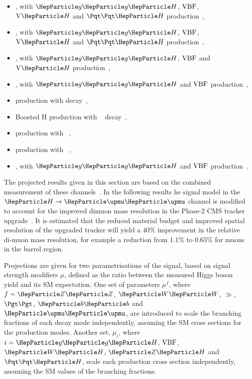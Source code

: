 \begin{itemize}
	\item \hgg, with $\ggh$, $\mathrm{VBF}$, $\vh$ and $\tth$ production~\cite{Sirunyan:2018ouh},
	\item \hzzllll, with $\ggh$, $\mathrm{VBF}$, $\vh$ and $\tth$ production~\cite{HIG16041},
	\item \hwwlnln, with $\ggh$, $\mathrm{VBF}$ and $\vh$ production~\cite{HIG-16-042},
	\item \htt, with $\ggh$ and $\mathrm{VBF}$ production~\cite{HIG16043},
	\item \vh production with \hbb decay~\cite{HIG16044},
	\item Boosted H production with \hbb~ decay~\cite{HIG17010},
	\item \tth production with \hlep~\cite{Sirunyan:2018shy},
	\item \tth production with \hbb~\cite{bib:hig-17-026,Sirunyan:2018ygk},
	\item \hmm, with $\ggh$ and $\mathrm{VBF}$ production~\cite{HIG-17-019}.
\end{itemize}

The projected results given in this section are based on the combined measurement of these channels~\cite{Sirunyan:2018koj}. In the following results he signal model in the $\hmm$ channel is modified to account for the improved dimuon mass resolution in the Phase-2 CMS tracker upgrade~\cite{Klein:2017nke}. It is estimated that the reduced material budget and improved spatial resolution of the upgraded tracker will yield a $40\%$ improvement in the relative di-muon mass resolution, for example a reduction from $1.1\%$ to $0.65\%$ for muons in the barrel region.


Projections are given for two parametrisations of the signal, based on signal strength modifiers $\mu$, defined as the ratio between the measured Higgs boson yield and its SM expectation. One set of parameters $\mu^{f}$, where $f = \zz$, $\ww$, $\gg$, $\tautau$, $\bb$ and $\mumu$, are introduced to scale the branching fractions of each decay mode independently, assuming the SM cross sections for the production modes. Another set, $\mu_{i}$, where $i=\ggh$, $\mathrm{VBF}$, $\wh$, $\zh$ and $\tth$, scale each production cross section independently, assuming the SM values of the branching fractions.

